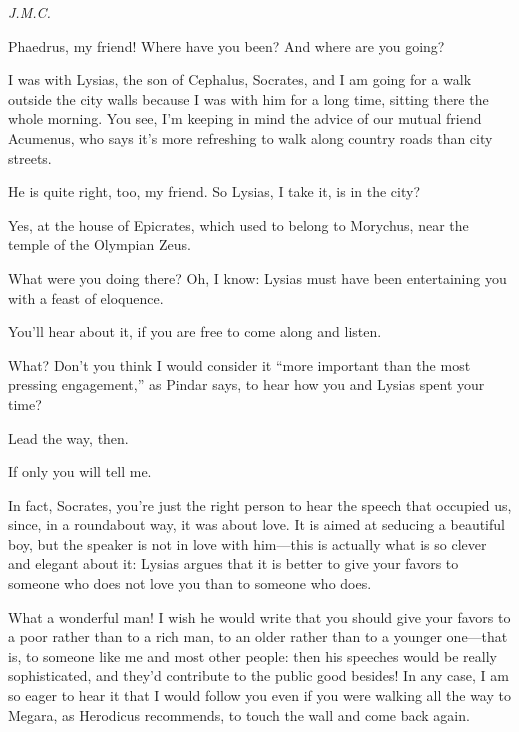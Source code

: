 {\em J.M.C.}\par
\blank[line]

\saysocrates Phaedrus, my friend! Where have you been? And where are you 
going?

\sayphaedrus I was with Lysias, the son of Cephalus, Socrates, and I am going for a walk outside the city walls because I was with him for a long time, sitting there the whole morning. You see, I'm keeping in
mind the advice of our mutual friend Acumenus, who  says it's more refreshing to walk along country roads than city streets.

\saysocrates He is quite right, too, my friend. So Lysias, I take it, is in
the city?

\sayphaedrus Yes, at the house of Epicrates, which used to belong to
Morychus, 
near the temple of the Olympian Zeus.

\saysocrates What were you doing there? Oh, I know: Lysias must have been
entertaining you with a feast of eloquence.

\sayphaedrus You'll hear about it, if you are free to come along and
listen.

\saysocrates What? Don't you think I would consider it “more important than
the most pressing engagement,” as Pindar says, to hear how you and
Lysias spent your time?

\sayphaedrus Lead the way, then.

\saysocrates If only you will tell me.

\sayphaedrus In fact, Socrates, you're just the right person to hear the
speech that occupied us, since, in a roundabout way, it was about love.
It is aimed at seducing a beautiful boy, but the speaker is not in love
with him---this is actually what is so clever and elegant about it:
Lysias argues that it is better to give your favors to someone who does
not love you than to someone who does.

\saysocrates What a wonderful man! I wish he would write that you should 
give your favors to a poor rather than to a rich man, to an
older rather than to a younger one---that is, to someone like me and
most other people: then his speeches would be really sophisticated, and
they'd contribute to the public good besides! In any case, I am so eager
to hear it that I would follow you even if you were walking all the way
to Megara, as Herodicus recommends, to touch the wall and come back
again.

